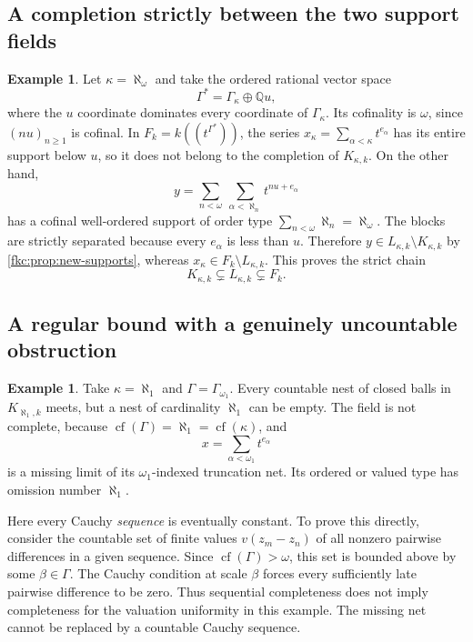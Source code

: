 \documentclass[11pt,letterpaper]{article}
\numberwithin{equation}{section}
\theoremstyle{definition}
\newtheorem{example}[theorem]{Example}
\theoremstyle{remark}
\newcommand{\Q}{\mathbb Q}
\newcommand{\cf}{\operatorname{cf}}
\begin{document}
\subsection{A completion strictly between the two support fields}
\begin{example}\label{fkc:ex:partialcompletion}
Let $\kappa=\aleph_\omega$ and take the ordered rational vector space
\[
 \Gamma^*=\Gamma_\kappa\oplus\Q u,
\]
where the $u$ coordinate dominates every coordinate of $\Gamma_\kappa$. Its cofinality is $\omega$, since $(nu)_{n\ge1}$ is cofinal. In $F_k=k((t^{\Gamma^*}))$, the series $x_\kappa=\sum_{\alpha<\kappa}t^{e_\alpha}$ has its entire support below $u$, so it does not belong to the completion of $K_{\kappa,k}$. On the other hand,
\[
 y=\sum_{n<\omega}\ \sum_{\alpha<\aleph_n}t^{nu+e_\alpha}
\]
has a cofinal well-ordered support of order type $\sum_{n<\omega}\aleph_n=\aleph_\omega$. The blocks are strictly separated because every $e_\alpha$ is less than $u$. Therefore $y\in L_{\kappa,k}\setminus K_{\kappa,k}$ by \cref{fkc:prop:new-supports}, whereas $x_\kappa\in F_k\setminus L_{\kappa,k}$. This proves the strict chain
\[
 K_{\kappa,k}\subsetneq L_{\kappa,k}\subsetneq F_k.
\]
\end{example}

\subsection{A regular bound with a genuinely uncountable obstruction}
\begin{example}\label{fkc:ex:regular}
Take $\kappa=\aleph_1$ and $\Gamma=\Gamma_{\omega_1}$. Every countable nest of closed balls in $K_{\aleph_1,k}$ meets, but a nest of cardinality $\aleph_1$ can be empty. The field is not complete, because $\cf(\Gamma)=\aleph_1=\cf(\kappa)$, and
\[
 x=\sum_{\alpha<\omega_1}t^{e_\alpha}
\]
is a missing limit of its $\omega_1$-indexed truncation net. Its ordered or valued type has omission number $\aleph_1$.
\end{example}

Here every Cauchy \emph{sequence} is eventually constant. To prove this directly, consider the countable set of finite values $v(z_m-z_n)$ of all nonzero pairwise differences in a given sequence. Since $\cf(\Gamma)>\omega$, this set is bounded above by some $\beta\in\Gamma$. The Cauchy condition at scale $\beta$ forces every sufficiently late pairwise difference to be zero. Thus sequential completeness does not imply completeness for the valuation uniformity in this example. The missing net cannot be replaced by a countable Cauchy sequence.
\end{document}
